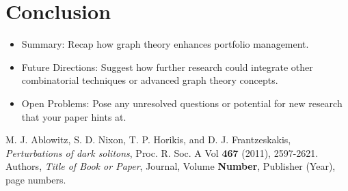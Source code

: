 \documentclass{article}
\begin{document}
\section{Conclusion}

\begin{itemize}
    \item Summary: Recap how graph theory enhances portfolio management.
    \item Future Directions: Suggest how further research could integrate other combinatorial techniques or advanced graph theory concepts.
    \item Open Problems: Pose any unresolved questions or potential for new research that your paper hints at.
\end{itemize}



\begin{thebibliography}{99}
    M. J. Ablowitz, S. D. Nixon, T. P. Horikis, and D. J. Frantzeskakis, \emph{Perturbations of dark solitons}, Proc. R. Soc. A Vol \textbf{467} (2011), 2597-2621.
    Authors, \emph{Title of Book or Paper}, Journal, Volume \textbf{Number}, Publisher (Year), page numbers.
\end{thebibliography}
\end{document}
